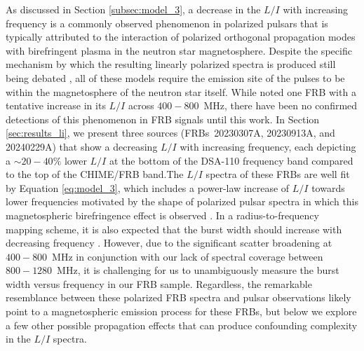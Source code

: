 \documentclass[twocolumn, linenumbers]{aastex701}
\begin{document}
As discussed in Section \ref{subsec:model_3}, a decrease in the $L/I$ with increasing frequency is a commonly observed phenomenon in polarized pulsars that is typically attributed to the interaction of polarized orthogonal propagation modes with birefringent plasma in the neutron star magnetosphere. Despite the specific mechanism by which the resulting linearly polarized spectra is produced still being debated \citep[e.g.,][]{1975ApJ...196...51R, 1986ApJ...302..138B, 1997ApJ...475..763M, 1998A&A...336..209V, 2005MNRAS.359..481K, 2008MNRAS.388..261J}, all of these models require the emission site of the pulses to be within the magnetosphere of the neutron star itself. While \cite{2024ApJ...968...50P} noted one FRB with a tentative increase in its $L/I$ across $400-800$~MHz, there have been no confirmed detections of this phenomenon in FRB signals until this work. In Section \ref{sec:results_li}, we present three sources (FRBs~20230307A, 20230913A, and 20240229A) that show a decreasing $L/I$ with increasing frequency, each depicting a $\sim 20-40\%$ lower $L/I$ at the bottom of the DSA-110 frequency band compared to the top of the CHIME/FRB band.The $L/I$ spectra of these FRBs are well fit by Equation \ref{eq:model_3}, which includes a power-law increase of $L/I$ towards lower frequencies motivated by the shape of polarized pulsar spectra in which this magnetospheric birefringence effect is observed \citep{1975ApJ...196...83M}. In a radius-to-frequency mapping scheme, it is also expected that the burst width should increase with decreasing frequency \citep[e.g.,][]{1997ApJ...475..763M}. However, due to the significant scatter broadening at $400-800$~MHz in conjunction with our lack of spectral coverage between $800-1280$~MHz, it is challenging for us to unambiguously measure the burst width versus frequency in our FRB sample. Regardless, the remarkable resemblance between these polarized FRB spectra and pulsar observations likely point to a magnetospheric emission process for these FRBs, but below we explore a few other possible propagation effects that can produce confounding complexity in the $L/I$ spectra.
\end{document}
